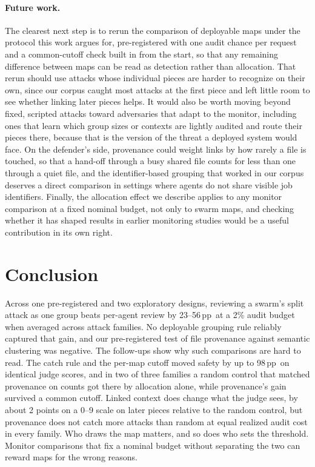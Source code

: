 \documentclass[10pt]{article}
\newcommand{\pp}{\,pp}
\begin{document}
\paragraph{Future work.} The clearest next step is to rerun the comparison of deployable maps under the protocol this work argues for, pre-registered with one audit chance per request and a common-cutoff check built in from the start, so that any remaining difference between maps can be read as detection rather than allocation. That rerun should use attacks whose individual pieces are harder to recognize on their own, since our corpus caught most attacks at the first piece and left little room to see whether linking later pieces helps. It would also be worth moving beyond fixed, scripted attacks toward adversaries that adapt to the monitor, including ones that learn which group sizes or contexts are lightly audited and route their pieces there, because that is the version of the threat a deployed system would face. On the defender's side, provenance could weight links by how rarely a file is touched, so that a hand-off through a busy shared file counts for less than one through a quiet file, and the identifier-based grouping that worked in our corpus deserves a direct comparison in settings where agents do not share visible job identifiers. Finally, the allocation effect we describe applies to any monitor comparison at a fixed nominal budget, not only to swarm maps, and checking whether it has shaped results in earlier monitoring studies would be a useful contribution in its own right.

\section{Conclusion}
Across one pre-registered and two exploratory designs, reviewing a swarm's split attack as one group beats per-agent review by 23--56\pp\ at a 2\% audit budget when averaged across attack families. No deployable grouping rule reliably captured that gain, and our pre-registered test of file provenance against semantic clustering was negative. The follow-ups show why such comparisons are hard to read. The catch rule and the per-map cutoff moved safety by up to 98\pp\ on identical judge scores, and in two of three families a random control that matched provenance on counts got there by allocation alone, while provenance's gain survived a common cutoff. Linked context does change what the judge sees, by about 2 points on a 0--9 scale on later pieces relative to the random control, but provenance does not catch more attacks than random at equal realized audit cost in every family. Who draws the map matters, and so does who sets the threshold. Monitor comparisons that fix a nominal budget without separating the two can reward maps for the wrong reasons.
\end{document}
